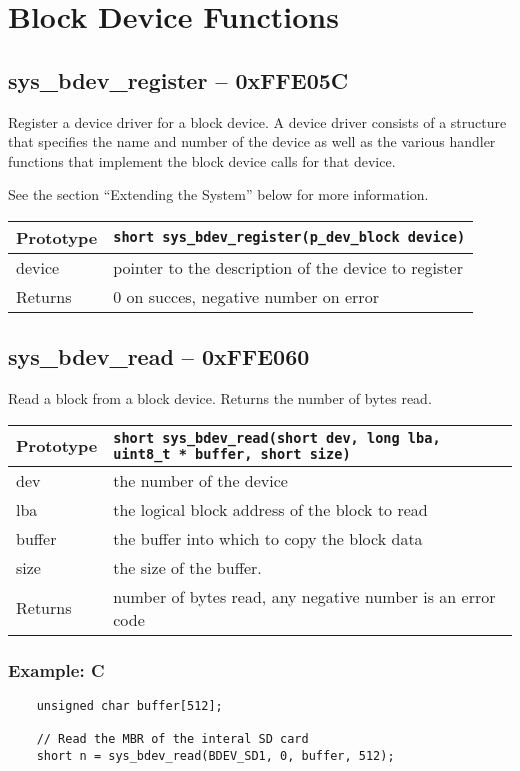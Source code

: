 \section{Block Device Functions}

\subsection*{sys\_bdev\_register -- 0xFFE05C}
Register a device driver for a block device. A device driver consists of a structure that specifies the name and number of the device as well as the various handler functions that implement the block device calls for that device.

See the section ``Extending the System'' below for more information.

\bigskip

\begin{tabular}{|l||l|} \hline
Prototype & \lstinline!short sys_bdev_register(p_dev_block device)! \\ \hline
device & pointer to the description of the device to register \\ \hline
Returns & 0 on succes, negative number on error \\ \hline
\end{tabular}

\subsection*{sys\_bdev\_read -- 0xFFE060}
Read a block from a block device. Returns the number of bytes read.

\bigskip

\begin{tabular}{|l||l|} \hline
Prototype & \lstinline!short sys_bdev_read(short dev, long lba, uint8_t * buffer, short size)! \\ \hline
dev & the number of the device \\ \hline
lba & the logical block address of the block to read \\ \hline
buffer & the buffer into which to copy the block data \\ \hline
size & the size of the buffer. \\ \hline
Returns & number of bytes read, any negative number is an error code \\ \hline
\end{tabular}

\subsubsection*{Example: C}
\begin{lstlisting}
    unsigned char buffer[512];
    
    // Read the MBR of the interal SD card
    short n = sys_bdev_read(BDEV_SD1, 0, buffer, 512);
\end{lstlisting}

